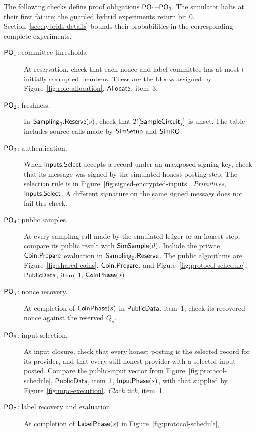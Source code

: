 The following checks define proof obligations $\mathsf{PO}_{1}$--$\mathsf{PO}_{9}$.
The simulator halts at their first failure; the guarded hybrid experiments
return bit $0$.  Section~\ref{sec:hybrids-details} bounds their probabilities in the
corresponding complete experiments.
\begin{description}
 \item[$\mathsf{PO}_{1}$: committee thresholds.]\label{po:threshold}
 At reservation, check that each nonce and label committee has at most
 $t$ initially corrupted members.  These are the blocks assigned by
 Figure~\ref{fig:role-allocation}, $\mathsf{Allocate}$, item~3.
 \item[$\mathsf{PO}_{2}$: freshness.]\label{po:freshness}
 In $\mathsf{Sampling}_0.\mathsf{Reserve}(s)$, check that $T[\mathsf{SampleCircuit}_s]$ is unset.
 The table includes source calls made by $\mathsf{SimSetup}$ and $\mathsf{SimRO}$.
 \item[$\mathsf{PO}_{3}$: authentication.]\label{po:authentication}
 When $\mathsf{Inputs}.\mathsf{Select}$ accepts a record under an unexposed signing
 key, check that its message was signed by the simulated honest posting
 step.  The selection rule is in Figure~\ref{fig:signed-encrypted-inputs},
 \emph{Primitives}, $\mathsf{Inputs}.\mathsf{Select}$.  A different signature on the
 same signed message does not fail this check.
 \item[$\mathsf{PO}_{4}$: public samples.]\label{po:samples}
 At every sampling call made by the simulated ledger or an honest step,
 compare its public result with $\mathsf{SimSample}(d)$.  Include the private
 $\mathsf{Coin}.\mathsf{Prepare}$ evaluation in $\mathsf{Sampling}_0.\mathsf{Reserve}$.  The public
 algorithms are Figure~\ref{fig:shared-coins}, $\mathsf{Coin}.\mathsf{Prepare}$, and
 Figure~\ref{fig:protocol-schedule}, $\mathsf{PublicData}$, item~1,
 $\mathsf{CoinPhase}(s)$.
 \item[$\mathsf{PO}_{5}$: nonce recovery.]\label{po:nonce}
 At completion of $\mathsf{CoinPhase}(s)$ in $\mathsf{PublicData}$, item~1, check
 its recovered nonce against the reserved $Q_s$.
 \item[$\mathsf{PO}_{6}$: input selection.]\label{po:inputs}
 At input closure, check that every honest posting is the selected
 record for its provider, and that every still-honest provider with a
 selected input posted.  Compare the public-input vector from
 Figure~\ref{fig:protocol-schedule}, $\mathsf{PublicData}$, item~1,
 $\mathsf{InputPhase}(s)$, with that supplied by Figure~\ref{fig:mpc-execution},
 \emph{Clock tick}, item~1.
 \item[$\mathsf{PO}_{7}$: label recovery and evaluation.]\label{po:evaluation}
 At completion of $\mathsf{LabelPhase}(s)$ in Figure~\ref{fig:protocol-schedule},

\end{description}
